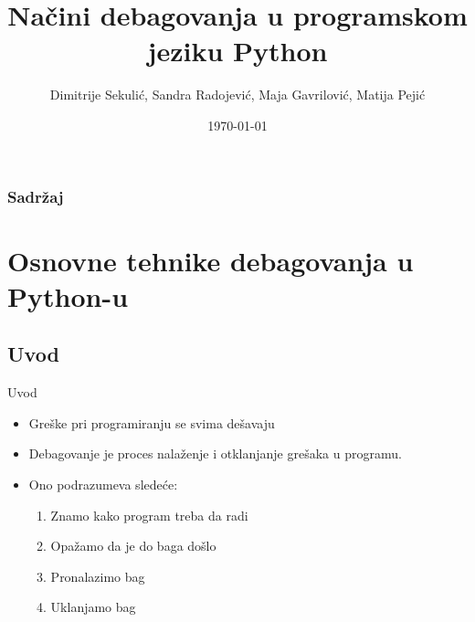 \documentclass{beamer}
\title[Debagovanje Python]{Načini debagovanja u programskom\\ jeziku Python} %
\author{Dimitrije Sekulić, Sandra Radojević, Maja Gavrilović, Matija Pejić} %
\institute[UCLA] %
{
Matematički fakultet, Beograd \\ %
\medskip
}
\date{\today} %
\begin{document}
\begin{frame}
\titlepage %
\end{frame}

\begin{frame}
\frametitle{Sadržaj} %
\tableofcontents %
\end{frame}


\section{Osnovne tehnike debagovanja u Python-u} %
\subsection{Uvod}

\begin{frame}{Uvod}
\begin{itemize}
    \item Greške pri programiranju se svima dešavaju
    \item Debagovanje je proces nalaženje i otklanjanje grešaka u programu.
    \item Ono podrazumeva sledeće: 
    \begin{enumerate}
        \item Znamo kako program treba da radi
        \item Opažamo da je do baga došlo
        \item Pronalazimo bag
        \item Uklanjamo bag
    \end{enumerate}
\end{itemize}
\end{frame}
\end{document}
